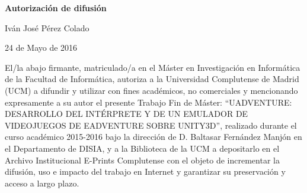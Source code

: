 
\newpage

\thispagestyle{empty}

\begin{center}

{\bf \Huge Autorización de difusión}

\vspace{1cm}


   \large Iván José Pérez Colado\\

   \vspace{0.5cm}


   24 de Mayo de 2016\\

   \vspace{0.5cm}
   \end{center}
   
El/la abajo firmante, matriculado/a en el Máster en Investigación en Informática de la Facultad de Informática, autoriza a la Universidad Complutense de Madrid (UCM) a difundir y utilizar con fines académicos, no comerciales y mencionando expresamente a su autor el presente Trabajo Fin de Máster: “UADVENTURE: DESARROLLO DEL INTÉRPRETE Y DE UN EMULADOR DE VIDEOJUEGOS DE EADVENTURE SOBRE UNITY3D”, realizado durante el curso académico 2015-2016 bajo la dirección de D. Baltasar Fernández Manjón en el Departamento de DISIA, y a la Biblioteca de la UCM a depositarlo en el Archivo Institucional E-Prints Complutense con el objeto de incrementar la difusión, uso e impacto del trabajo en Internet y garantizar su preservación y acceso a largo plazo.


